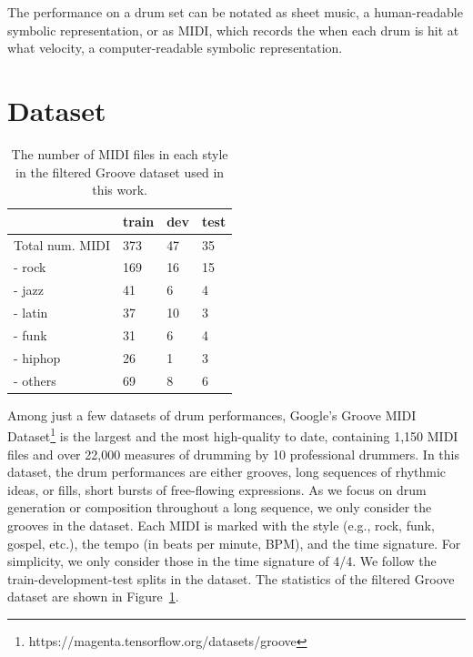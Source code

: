\documentclass[letterpaper]{article} %
\begin{document}
The performance on a drum set can be notated as sheet music, a human-readable symbolic representation, or as MIDI, which records the when each drum is hit at what velocity, a computer-readable symbolic representation.

\section{Dataset}
\begin{table}[t!]
\centering
\begin{tabular}{llll}
\toprule
            & train & dev & test \\ \midrule
Total num. MIDI   & 373   & 47  & 35   \\
- rock &   169    &  16   &  15    \\
- jazz &   41    &  6   &   4   \\
- latin &   37    &  10   &  3    \\
- funk &    31   &  6   &   4   \\
- hiphop &   26    &  1   &    3  \\
- others &   69    &  8   &   6   \\
\bottomrule
\end{tabular}
\caption{The number of MIDI files in each style in the filtered Groove dataset used in this work.}
\label{fig:dataset_stats}
\end{table}

Among just a few datasets of drum performances, Google's Groove MIDI Dataset\footnote{https://magenta.tensorflow.org/datasets/groove} is the largest and the most high-quality to date, containing 1,150 MIDI files and over 22,000 measures of drumming by 10 professional drummers. In this dataset, the drum performances are either grooves, long sequences of rhythmic ideas, or fills, short bursts of free-flowing expressions. As we focus on drum generation or composition throughout a long sequence, we only consider the grooves in the dataset. Each MIDI is marked with the style (e.g., rock, funk, gospel, etc.), the tempo (in beats per minute, BPM), and the time signature. For simplicity, we only consider those in the time signature of 4/4. We follow the train-development-test splits in the dataset. The statistics of the filtered Groove dataset are shown in Figure~\ref{fig:dataset_stats}.
\end{document}
